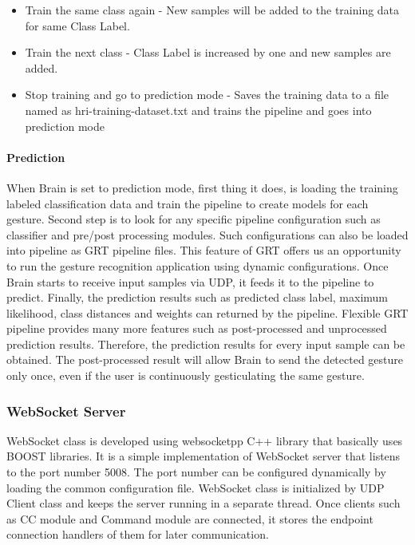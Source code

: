 \begin{itemize}
	\item Train the same class again - New samples will be added to the training data for same Class Label.
	\item Train the next class - Class Label is increased by one and new samples are added.
	\item Stop training and go to prediction mode - Saves the training data to a file named as hri-training-dataset.txt and trains the pipeline and goes into prediction mode
\end{itemize}

\paragraph*{Prediction} When Brain is set to prediction mode, first thing it does, is loading the training labeled classification data and train the pipeline to create models for each gesture. Second step is to look for any specific pipeline configuration such as classifier and pre/post processing modules. Such configurations can also be loaded into pipeline as GRT pipeline files. This feature of GRT offers us an opportunity to run the gesture recognition application using dynamic configurations. Once Brain starts to receive input samples via UDP, it feeds it to the pipeline to predict. Finally, the prediction results such as predicted class label, maximum likelihood, class distances and weights can returned by the pipeline. Flexible GRT pipeline provides many more features such as post-processed and unprocessed prediction results. Therefore, the prediction results for every input sample can be obtained. The post-processed result will allow Brain to send the detected gesture only once, even if the user is continuously gesticulating the same gesture.  

\subsubsection{WebSocket Server}
WebSocket class is developed using websocketpp C++ library that basically uses BOOST libraries. It is a simple implementation of WebSocket server that listens to the port number 5008. The port number can be configured dynamically by loading the common configuration file. WebSocket class is initialized by UDP Client class and keeps the server running in a separate thread. Once clients such as CC module and Command module are connected, it stores the endpoint connection handlers of them for later communication. 